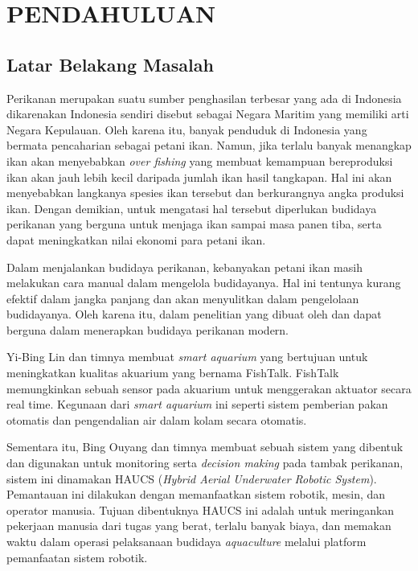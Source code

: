 
\chapter{PENDAHULUAN}

\section{Latar Belakang Masalah}

Perikanan merupakan suatu sumber penghasilan terbesar yang ada di Indonesia dikarenakan Indonesia sendiri disebut sebagai Negara Maritim yang memiliki arti Negara Kepulauan. Oleh karena itu, banyak penduduk di Indonesia yang bermata pencaharian sebagai petani ikan. Namun, jika terlalu banyak menangkap ikan akan menyebabkan \textit{over fishing} yang membuat kemampuan bereproduksi ikan akan jauh lebih kecil daripada jumlah ikan hasil tangkapan. Hal ini akan menyebabkan langkanya spesies ikan tersebut dan berkurangnya angka produksi ikan. Dengan demikian, untuk mengatasi hal tersebut diperlukan budidaya perikanan yang berguna untuk menjaga ikan sampai masa panen tiba, serta dapat meningkatkan nilai ekonomi para petani ikan.

Dalam menjalankan budidaya perikanan, kebanyakan petani ikan masih melakukan cara manual dalam mengelola budidayanya. Hal ini tentunya kurang efektif dalam jangka panjang dan akan menyulitkan dalam pengelolaan budidayanya. Oleh karena itu, dalam penelitian yang dibuat oleh \citep{fishtalk} dan \citep{haucs} dapat berguna dalam menerapkan budidaya perikanan modern.

Yi-Bing Lin dan timnya membuat \textit{smart aquarium} yang bertujuan untuk meningkatkan kualitas akuarium yang bernama FishTalk. FishTalk memungkinkan sebuah sensor pada akuarium untuk menggerakan aktuator secara real time. Kegunaan dari \textit{smart aquarium} ini seperti sistem pemberian pakan otomatis dan pengendalian air dalam kolam secara otomatis. \citep{fishtalk}

Sementara itu, Bing Ouyang dan timnya membuat sebuah sistem yang dibentuk dan digunakan untuk monitoring serta \textit{decision making} pada tambak perikanan, sistem ini dinamakan HAUCS (\textit{Hybrid Aerial Underwater Robotic System}). Pemantauan ini dilakukan dengan memanfaatkan sistem robotik, mesin, dan operator manusia. Tujuan dibentuknya HAUCS ini adalah untuk meringankan pekerjaan manusia dari tugas yang berat, terlalu banyak biaya, dan memakan waktu dalam operasi pelaksanaan budidaya \textit{aquaculture} melalui platform pemanfaatan sistem robotik. \citep{haucs}

